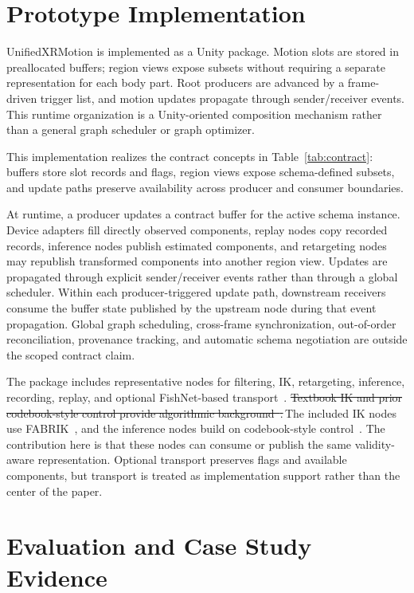 \documentclass[runningheads]{llncs}
\newcommand{\radd}[1]{\textcolor{revadd}{#1}}
\newcommand{\rdel}[1]{\textcolor{revdel}{\sout{#1}}}
\newcommand{\rrep}[2]{\rdel{#1}\,\radd{#2}}
\newcommand{\radd}[1]{#1}
\newcommand{\rdel}[1]{}
\newcommand{\rrep}[2]{#2}
\begin{document}
\section{Prototype Implementation}\label{sec:implementation}
UnifiedXRMotion is implemented as a Unity package. Motion slots are stored in preallocated buffers; region views expose subsets without requiring a separate representation for each body part. Root producers are advanced by a frame-driven trigger list, and motion updates propagate through sender/receiver events. This runtime organization is a Unity-oriented composition mechanism rather than a general graph scheduler or graph optimizer.

This implementation realizes the contract concepts in Table~\ref{tab:contract}: buffers store slot records and flags, region views expose schema-defined subsets, and update paths preserve availability across producer and consumer boundaries.

At runtime, a producer updates a contract buffer for the active schema instance. Device adapters fill directly observed components, replay nodes copy recorded records, inference nodes publish estimated components, and retargeting nodes may republish transformed components into another region view. Updates are propagated through explicit sender/receiver events rather than through a global scheduler. Within each producer-triggered update path, downstream receivers consume the buffer state published by the upstream node during that event propagation. Global graph scheduling, cross-frame synchronization, out-of-order reconciliation, provenance tracking, and automatic schema negotiation are outside the scoped contract claim.

The package includes representative nodes for filtering, IK, retargeting, inference, recording, replay, and optional FishNet-based transport\radd{~\cite{fishnet}}. \rrep{Textbook IK and prior codebook-style control provide algorithmic background~\cite{aristidou2011fabrik,starke2024categorical}.}{The included IK nodes use FABRIK~\cite{aristidou2011fabrik}, and the inference nodes build on codebook-style control~\cite{starke2024categorical}.} The contribution here is that these nodes can consume or publish the same validity-aware representation. Optional transport preserves flags and available components, but transport is treated as implementation support rather than the center of the paper.

\section{Evaluation and Case Study Evidence}\label{sec:evaluation}
\end{document}
